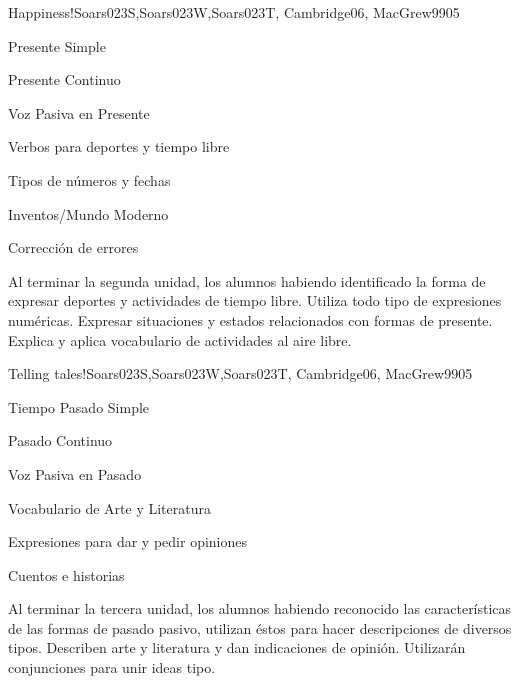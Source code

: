 \begin{syllabus}
\begin{unit}{Happiness!}{Soars023S,Soars023W,Soars023T, Cambridge06, MacGrew99}{0}{5}
   \begin{topics}
      \item Presente Simple
      \item Presente Continuo
      \item Voz Pasiva en Presente
      \item Verbos para deportes y tiempo libre
      \item Tipos de números y fechas
      \item Inventos/Mundo Moderno
      \item Corrección de errores
   \end{topics}

   \begin{unitgoals}
      \item Al terminar la segunda unidad, los alumnos habiendo identificado la forma de expresar deportes y actividades de tiempo libre. Utiliza todo tipo de expresiones numéricas. Expresar situaciones y estados relacionados con formas de presente. Explica y aplica vocabulario de actividades al aire libre. 
   \end{unitgoals}
\end{unit}

\begin{unit}{Telling tales!}{Soars023S,Soars023W,Soars023T, Cambridge06, MacGrew99}{0}{5}
   \begin{topics}
      \item Tiempo Pasado Simple
      \item Pasado Continuo
      \item Voz Pasiva en Pasado 
      \item Vocabulario de Arte y Literatura
      \item Expresiones para dar y pedir opiniones
      \item Cuentos e  historias
   \end{topics}

   \begin{unitgoals}
      \item Al terminar la tercera unidad, los alumnos habiendo reconocido las 
            características de las formas de pasado pasivo, utilizan éstos para 
            hacer descripciones de diversos tipos. Describen arte y literatura y 
            dan indicaciones de opinión. Utilizarán conjunciones para unir ideas tipo. 
   \end{unitgoals}
\end{unit}


\end{syllabus}
